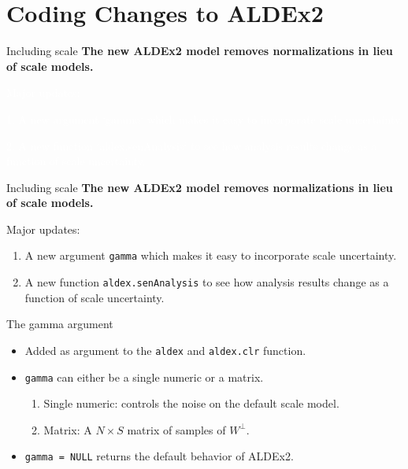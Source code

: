 \documentclass[
  ignorenonframetext,
]{beamer}
\providecommand{\tightlist}{%
  \setlength{\itemsep}{0pt}\setlength{\parskip}{0pt}}
\begin{document}
\hypertarget{coding-changes-to-aldex2}{%
\section{Coding Changes to ALDEx2}\label{coding-changes-to-aldex2}}

\begin{frame}{Including scale}
\protect\hypertarget{including-scale}{}
\textbf{The new ALDEx2 model removes normalizations in lieu of scale
models.}

\vspace{.25in}

\textcolor{white}{Major updates:}

\textcolor{white}{1. A new argument `gamma` which makes it easy to incorporate scale uncertainty.}

\textcolor{white}{2. A new function `aldex.senAnalysis` to see how analysis results change as a function of scale uncertainty.}
\end{frame}

\begin{frame}[fragile]{Including scale}
\protect\hypertarget{including-scale-1}{}
\textbf{The new ALDEx2 model removes normalizations in lieu of scale
models.}

\vspace{.25in}

Major updates:

\begin{enumerate}
\item
  A new argument \texttt{gamma} which makes it easy to incorporate scale
  uncertainty.
\item
  A new function \texttt{aldex.senAnalysis} to see how analysis results
  change as a function of scale uncertainty.
\end{enumerate}
\end{frame}

\begin{frame}[fragile]{The gamma argument}
\protect\hypertarget{the-gamma-argument}{}
\begin{itemize}
\item
  Added as argument to the \texttt{aldex} and \texttt{aldex.clr}
  function.
\item
  \texttt{gamma} can either be a single numeric or a matrix.

  \begin{enumerate}
  \tightlist
  \item
    Single numeric: controls the noise on the default scale model.
  \item
    Matrix: A \(N \times S\) matrix of samples of \(W^\perp\).
  \end{enumerate}
\item
  \texttt{gamma\ =\ NULL} returns the default behavior of ALDEx2.
\end{itemize}
\end{frame}
\end{document}
